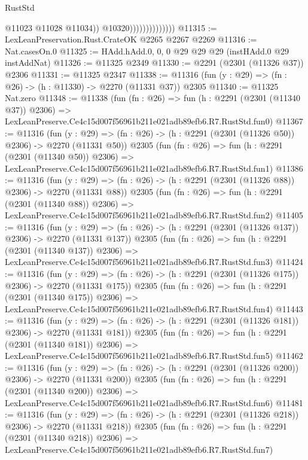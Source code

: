 \begin{lexlean}{RustStd}
\begin{coremodule}
                                    @11023
                                    @11028
                                    @11034))
                                @10320))))))))))))))
@11315 := LexLeanPreservation.Rust.CrateOK @2265 @2267 @2269
@11316 := Nat.casesOn.{0}
@11325 := HAdd.hAdd.{0, 0, 0} @29 @29 @29 (instHAdd.{0} @29 instAddNat)
@11326 := @11325 @2349
@11330 := @2291 (@2301 (@11326 @37)) @2306
@11331 := @11325 @2347
@11338 := @11316 (fun (y : @29) => (fn : @26) -> (h : @11330) -> @2270 (@11331 @37)) @2305
@11340 := @11325 Nat.zero
@11348 := @11338
    (fun (fn : @26) =>
    fun (h : @2291 (@2301 (@11340 @37)) @2306) =>
    LexLeanPreserve.Ce4c15d007f56961b211e021adb89efb6.R7.RustStd.fun0)
@11367 := @11316
    (fun (y : @29) => (fn : @26) -> (h : @2291 (@2301 (@11326 @50)) @2306) -> @2270 (@11331 @50))
    @2305
    (fun (fn : @26) =>
    fun (h : @2291 (@2301 (@11340 @50)) @2306) =>
    LexLeanPreserve.Ce4c15d007f56961b211e021adb89efb6.R7.RustStd.fun1)
@11386 := @11316
    (fun (y : @29) => (fn : @26) -> (h : @2291 (@2301 (@11326 @88)) @2306) -> @2270 (@11331 @88))
    @2305
    (fun (fn : @26) =>
    fun (h : @2291 (@2301 (@11340 @88)) @2306) =>
    LexLeanPreserve.Ce4c15d007f56961b211e021adb89efb6.R7.RustStd.fun2)
@11405 := @11316
    (fun (y : @29) => (fn : @26) -> (h : @2291 (@2301 (@11326 @137)) @2306) -> @2270 (@11331 @137))
    @2305
    (fun (fn : @26) =>
    fun (h : @2291 (@2301 (@11340 @137)) @2306) =>
    LexLeanPreserve.Ce4c15d007f56961b211e021adb89efb6.R7.RustStd.fun3)
@11424 := @11316
    (fun (y : @29) => (fn : @26) -> (h : @2291 (@2301 (@11326 @175)) @2306) -> @2270 (@11331 @175))
    @2305
    (fun (fn : @26) =>
    fun (h : @2291 (@2301 (@11340 @175)) @2306) =>
    LexLeanPreserve.Ce4c15d007f56961b211e021adb89efb6.R7.RustStd.fun4)
@11443 := @11316
    (fun (y : @29) => (fn : @26) -> (h : @2291 (@2301 (@11326 @181)) @2306) -> @2270 (@11331 @181))
    @2305
    (fun (fn : @26) =>
    fun (h : @2291 (@2301 (@11340 @181)) @2306) =>
    LexLeanPreserve.Ce4c15d007f56961b211e021adb89efb6.R7.RustStd.fun5)
@11462 := @11316
    (fun (y : @29) => (fn : @26) -> (h : @2291 (@2301 (@11326 @200)) @2306) -> @2270 (@11331 @200))
    @2305
    (fun (fn : @26) =>
    fun (h : @2291 (@2301 (@11340 @200)) @2306) =>
    LexLeanPreserve.Ce4c15d007f56961b211e021adb89efb6.R7.RustStd.fun6)
@11481 := @11316
    (fun (y : @29) => (fn : @26) -> (h : @2291 (@2301 (@11326 @218)) @2306) -> @2270 (@11331 @218))
    @2305
    (fun (fn : @26) =>
    fun (h : @2291 (@2301 (@11340 @218)) @2306) =>
    LexLeanPreserve.Ce4c15d007f56961b211e021adb89efb6.R7.RustStd.fun7)

\end{coremodule}
\end{lexlean}
